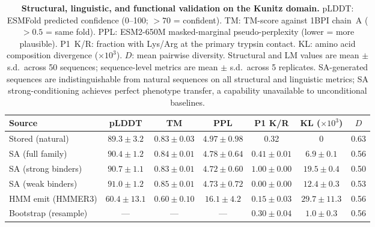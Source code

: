 \documentclass{article}
\theoremstyle{definition}
\theoremstyle{remark}
\begin{document}
\begin{table}[p]
  \centering
  \caption{\textbf{Structural, linguistic, and functional validation on the Kunitz domain.}
  pLDDT: ESMFold predicted confidence (0--100; $>70$ = confident).
  TM: TM-score against 1BPI chain~A ($>0.5$ = same fold).
  PPL: ESM2-650M masked-marginal pseudo-perplexity (lower = more plausible).
  P1~K/R: fraction with Lys/Arg at the primary trypsin contact.
  KL: amino acid composition divergence ($\times 10^{3}$).
  $D$: mean pairwise diversity.
  Structural and LM values are mean $\pm$ s.d.\ across 50 sequences;
  sequence-level metrics are mean $\pm$ s.d.\ across 5 replicates.
  SA-generated sequences are indistinguishable from natural sequences on all
  structural and linguistic metrics; SA strong-conditioning achieves perfect
  phenotype transfer, a capability unavailable to unconditional baselines.}
  \label{tab:structure-validation}
  \small
  \begin{tabular}{lcccccc}
    \toprule
    Source & pLDDT & TM & PPL & P1 K/R & KL ($\times 10^{3}$) & $D$ \\
    \midrule
    Stored (natural)      & $89.3 \pm 3.2$  & $0.83 \pm 0.03$ & $4.97 \pm 0.98$ & 0.32 & 0 & 0.63 \\
    SA (full family)      & $90.4 \pm 1.2$  & $0.84 \pm 0.01$ & $4.78 \pm 0.64$ & $0.41 \pm 0.01$ & $6.9 \pm 0.1$ & 0.56 \\
    SA (strong binders)   & $90.7 \pm 1.1$  & $0.83 \pm 0.01$ & $4.72 \pm 0.60$ & $1.00 \pm 0.00$ & $19.5 \pm 0.4$ & 0.50 \\
    SA (weak binders)     & $91.0 \pm 1.2$  & $0.85 \pm 0.01$ & $4.73 \pm 0.72$ & $0.00 \pm 0.00$ & $12.4 \pm 0.3$ & 0.53 \\
    HMM emit (HMMER3)     & $60.4 \pm 13.1$ & $0.60 \pm 0.10$ & $16.1 \pm 4.2$  & $0.15 \pm 0.03$ & $29.7 \pm 11.3$ & 0.56 \\
    Bootstrap (resample)  & ---             & ---              & ---              & $0.30 \pm 0.04$ & $1.0 \pm 0.3$ & 0.56 \\
    \bottomrule
  \end{tabular}
\end{table}
\end{document}
